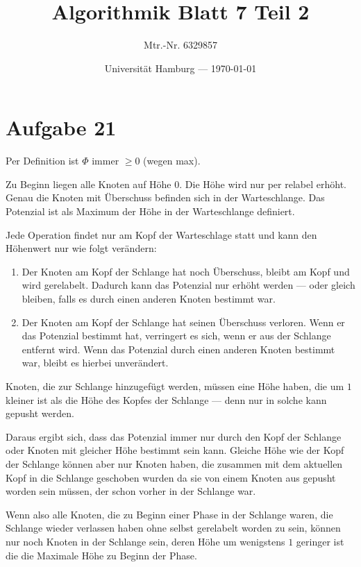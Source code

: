 \documentclass[parskip=half,a4paper]{scrartcl}
\title{Algorithmik Blatt 7 Teil 2}
\author{Mtr.-Nr. 6329857}
\date{Universität Hamburg --- \today}
\begin{document}
\maketitle %
\linenumbers

\section*{Aufgabe 21}

Per Definition ist $\Phi$ immer $\ge 0$ (wegen max).

Zu Beginn liegen alle Knoten auf Höhe 0. Die Höhe wird nur per relabel erhöht. Genau die Knoten mit Überschuss befinden sich in der Warteschlange. Das Potenzial ist als Maximum der Höhe in der Warteschlange definiert.

Jede Operation findet nur am Kopf der Warteschlage statt und kann den Höhenwert nur wie folgt verändern:

\begin{enumerate}
    \item Der Knoten am Kopf der Schlange hat noch Überschuss, bleibt am Kopf und wird gerelabelt. Dadurch kann das Potenzial nur erhöht werden --- oder gleich bleiben, falls es durch einen anderen Knoten bestimmt war.
    \item Der Knoten am Kopf der Schlange hat seinen Überschuss verloren. Wenn er das Potenzial bestimmt hat, verringert es sich, wenn er aus der Schlange entfernt wird. Wenn das Potenzial durch einen anderen Knoten bestimmt war, bleibt es hierbei unverändert.
\end{enumerate}

Knoten, die zur Schlange hinzugefügt werden, müssen eine Höhe haben, die um $1$ kleiner ist als die Höhe des Kopfes der Schlange --- denn nur in solche kann gepusht werden.

Daraus ergibt sich, dass das Potenzial immer nur durch den Kopf der Schlange oder Knoten mit gleicher Höhe bestimmt sein kann. Gleiche Höhe wie der Kopf der Schlange können aber nur Knoten haben, die zusammen mit dem aktuellen Kopf in die Schlange geschoben wurden da sie von einem Knoten aus gepusht worden sein müssen, der schon vorher in der Schlange war.

Wenn also alle Knoten, die zu Beginn einer Phase in der Schlange waren, die Schlange wieder verlassen haben ohne selbst gerelabelt worden zu sein, können nur noch Knoten in der Schlange sein, deren Höhe um wenigstens $1$ geringer ist die die Maximale Höhe zu Beginn der Phase.
\end{document}
